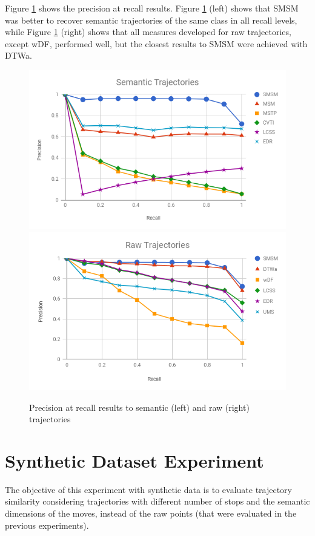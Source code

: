 {Figure {\ref{fig:geolife_precision_recall}} shows the precision at recall results. Figure {\ref{fig:geolife_precision_recall}} (left) shows that SMSM was better to recover semantic trajectories of the same class in all recall levels, while Figure {\ref{fig:geolife_precision_recall}} (right) shows that all measures developed for raw trajectories, except wDF, performed well, but  the closest results to SMSM were achieved with DTWa.}


\begin{figure}[ht!]
\centerline{
\centering
\includegraphics[width=.55\textwidth]{Images/new_P_R-chart_Geolife.png}
\includegraphics[width=.55\textwidth]{Images/new_P_R-chart_Geolife-raw.png}
}
\caption{Precision at recall results to semantic (left) and raw (right) trajectories}
\label{fig:geolife_precision_recall}
\end{figure}

\section{Synthetic Dataset Experiment}\label{sec:hermoupolis}
{The objective of this experiment with synthetic data is to evaluate trajectory similarity considering trajectories with different number of stops and the semantic dimensions of the moves, instead of the raw points (that were evaluated in the previous experiments).}


